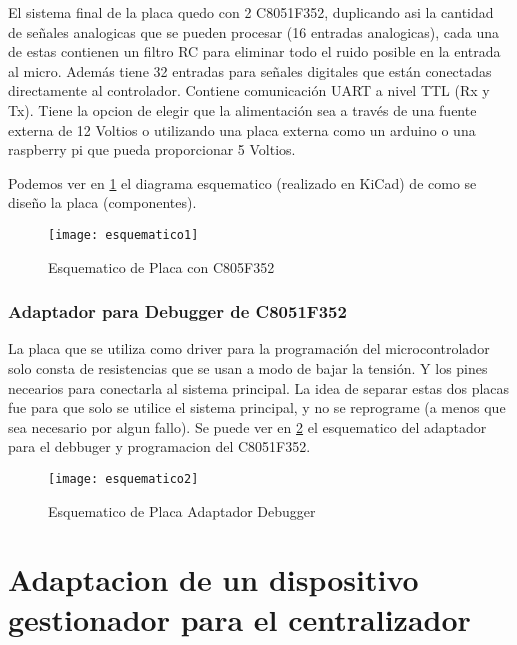 \documentclass[a4paper]{article}
\begin{document}
 El sistema final de la placa quedo con 2 C8051F352, duplicando asi la cantidad de señales analogicas que se pueden procesar (16 entradas analogicas), cada una de estas contienen un filtro RC para eliminar todo el ruido posible en la entrada al micro. Además tiene 32 entradas para señales digitales que están conectadas directamente al controlador. Contiene comunicación UART a nivel TTL (Rx y Tx). 
Tiene la opcion de elegir que la alimentación sea a través de una fuente externa de 12 Voltios o utilizando una placa externa como un arduino o una raspberry pi que pueda proporcionar 5 Voltios. 

Podemos ver en \ref{fig:esquematico1} el diagrama esquematico (realizado en KiCad) de como se diseño la placa (componentes).

\begin{figure}[h]
  \centering
  \texttt{[image: esquematico1]}
  \caption{Esquematico de Placa con C805F352}\label{fig:esquematico1}
\end{figure}


\subsubsection{Adaptador para Debugger de C8051F352} %
\label{ssub:adaptador para debugger microcontrolador}

La placa que se utiliza como driver para la programación del microcontrolador solo consta de resistencias que se usan a modo de bajar la tensión. Y los pines necearios para conectarla al sistema principal. La idea de separar estas dos placas fue para que solo se utilice el sistema principal, y no se reprograme (a menos que sea necesario por algun fallo).
Se puede ver en \ref{fig:esquematico2} el esquematico del adaptador para el debbuger y programacion del C8051F352.

\begin{figure}[h]
  \centering
  \texttt{[image: esquematico2]}
  \caption{Esquematico de Placa Adaptador Debugger}\label{fig:esquematico2}
\end{figure}
 






\section{Adaptacion de un dispositivo gestionador para el centralizador} %
\label{sec:adaptacion_de_un_dispositivo_gestionador_para_un_centralizador}
\end{document}
